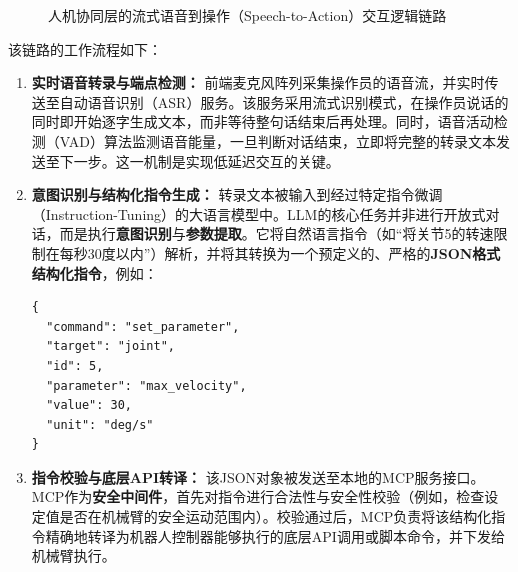 \documentclass{cumcmthesis}
\begin{document}
\begin{figure}[htbp]
{
    } %
    \caption{人机协同层的流式语音到操作（Speech-to-Action）交互逻辑链路}
    \label{fig:speech_to_action_pipeline_revised}
\end{figure}

该链路的工作流程如下：
\begin{enumerate}
    \item \textbf{实时语音转录与端点检测：} 前端麦克风阵列采集操作员的语音流，并实时传送至自动语音识别（ASR）服务。该服务采用流式识别模式，在操作员说话的同时即开始逐字生成文本，而非等待整句话结束后再处理。同时，语音活动检测（VAD）算法监测语音能量，一旦判断对话结束，立即将完整的转录文本发送至下一步。这一机制是实现低延迟交互的关键。

    \item \textbf{意图识别与结构化指令生成：} 转录文本被输入到经过特定指令微调（Instruction-Tuning）的大语言模型中。LLM的核心任务并非进行开放式对话，而是执行\textbf{意图识别}与\textbf{参数提取}。它将自然语言指令（如“将关节5的转速限制在每秒30度以内”）解析，并将其转换为一个预定义的、严格的\textbf{JSON格式结构化指令}，例如：
        \begin{verbatim}
{
  "command": "set_parameter",
  "target": "joint",
  "id": 5,
  "parameter": "max_velocity",
  "value": 30,
  "unit": "deg/s"
}
    \end{verbatim}

    \item \textbf{指令校验与底层API转译：} 该JSON对象被发送至本地的MCP服务接口。MCP作为\textbf{安全中间件}，首先对指令进行合法性与安全性校验（例如，检查设定值是否在机械臂的安全运动范围内）。校验通过后，MCP负责将该结构化指令精确地转译为机器人控制器能够执行的底层API调用或脚本命令，并下发给机械臂执行。
\end{enumerate}
\end{document}
